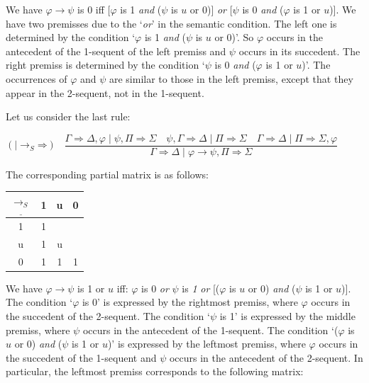 \documentclass[11pt,a4paper,titlepage]{article}
\theoremstyle{definition}
\newcommand{\3}{\vspace{.3in}}
\newcommand{\2}{\vspace{.2in}}
\newcommand{\1}{\vspace{.1in}}
\newcommand{\5}{\vspace{.05in}}
\begin{document}
\1

We have $\varphi\rightarrow\psi$ is 0 iff [$\varphi$ is 1 \textit{and} ($\psi$ is $u$ or 0)] \textit{or} [$\psi$ is 0 \textit{and} ($\varphi$ is 1 or $u$)].  We have two premisses due to the `\textit{or}' in the semantic condition. The left one is determined by the condition `$\varphi$ is 1 \textit{and} ($\psi$ is $u$ or 0)'. So $ \varphi $ occurs in the antecedent of the 1-sequent of the left premiss and $ \psi $ occurs in its succedent. The right premiss is determined by the condition `$\psi$ is 0 \textit{and} ($\varphi$ is 1 or $u$)'. The occurrences of $ \varphi $ and $ \psi$ are similar to those in the left premiss, except that they appear in the 2-sequent, not in the 1-sequent.

Let us consider the last rule:

\begin{flushleft}
	{\small $(\mathord{\mid \rightarrow_S}\mathord{\Rightarrow})$ \ $\dfrac{\Gamma
			\Rightarrow \Delta, \varphi \mid \psi, \Pi\Rightarrow\Sigma \quad\psi, \Gamma\Rightarrow\Delta \mid
			\Pi \Rightarrow \Sigma \quad \Gamma\Rightarrow\Delta \mid \Pi\Rightarrow\Sigma, \varphi} {\Gamma
			\Rightarrow \Delta \mid \varphi\rightarrow\psi, \Pi\Rightarrow\Sigma}$}
\end{flushleft} 

The corresponding partial matrix is as follows:

\1

\begin{tabular}{|c|ccc|}
	\hline
	$\underline{\rightarrow_S} $ & 1 & u & 0 \\
	\hline
	1 & 1 &  &  \\
	u & 1 & u &  \\
	0 & 1 & 1 & 1 \\
	\hline
\end{tabular} 

\1

We have $\varphi\rightarrow\psi$ is 1 or $u$ iff: $\varphi$ is 0 \textit{or} $\psi$ is \textit{1} \textit{or} [($\varphi$ is $u$ or 0) \textit{and} ($\psi$ is 1 or $u$)]. The condition `$\varphi$ is 0' is expressed by the rightmost premiss, where $\varphi$ occurs in the succedent of the 2-sequent.  The condition `$\psi$ is 1' is expressed by the middle premiss, where $\psi$ occurs in the antecedent of the 1-sequent. The condition `($\varphi$ is $u$ or 0) \textit{and} ($\psi$ is 1 or $u$)' is expressed by the leftmost premiss, where $\varphi$ occurs in the succedent of the 1-sequent and $\psi$ occurs in the antecedent of the 2-sequent. In particular, the leftmost premiss corresponds to the following matrix:
\end{document}
